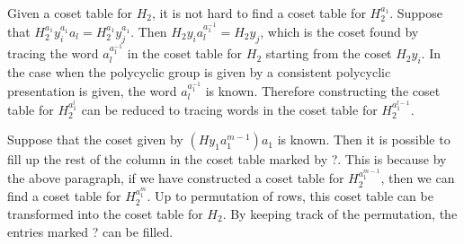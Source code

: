 \documentclass[12 pt]{article}
\begin{document}
Given a coset table for $H_2$, it is not hard to find a coset
table for $H_2^{a_1}$. Suppose that
$H_2^{a_1}y_i^{a_1}a_l = H_2^{a_1}y_j^{a_1}$. Then
$H_2y_ia_l^{a_1^{-1}} = H_2y_j$, which is the coset found by
tracing the word $a_l^{a_1^{-1}}$ in the coset table for $H_2$
starting from the coset $H_2y_i$. In the case when the
polycyclic group is given by a consistent polycyclic
presentation is given, the word $a_l^{a_1^{-1}}$ is known.
Therefore constructing the coset table for $H_2^{a_1^l}$ can be
reduced to tracing words in the coset table for $H_2^{a_1^{l-1}}$.

Suppose that the coset given by $(Hy_1a_1^{m-1})a_1$ is known. Then
it is possible to fill up the rest of the column in the coset table
marked by ?. This is because by the above paragraph, if we have
constructed a coset table for $H_2^{a_1^{m-1}}$, then we can find
a coset table for $H_2^{a_1^m}$. Up to permutation of rows, this
coset table can be transformed into the coset table for $H_2$. By
keeping track of the permutation, the entries marked ? can be filled.

\end{document}

